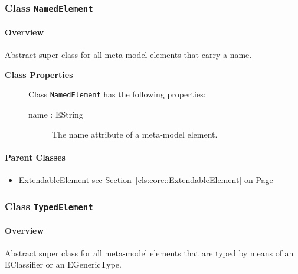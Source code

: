 \subsubsection{\Large{Class \bfseries \texttt{NamedElement}\normalfont}}
\label{cls:core::NamedElement} 
\paragraph{Overview}

	
			
Abstract super class for all meta-model elements that carry a name. 	
		
	


\begin{description}

	\item[\textbf{Class Properties}] Class \texttt{NamedElement} has the following properties:
	\begin{description}
\item[name : EString 	]

\hspace{\fill}
\nopagebreak


	
			
The name attribute of a meta-model element.	
		
	
	\end{description}
	
	

\end{description}

\paragraph{Parent Classes}
\begin{itemize}
\item ExtendableElement see Section~\ref{cls:core::ExtendableElement} on Page~\pageref{cls:core::ExtendableElement}\end{itemize}
\subsubsection{\Large{Class \bfseries \texttt{TypedElement}\normalfont}}
\label{cls:core::TypedElement} 
\paragraph{Overview}

	
			
Abstract super class for all meta-model elements that are typed by means of an EClassifier or an EGenericType.	
		
